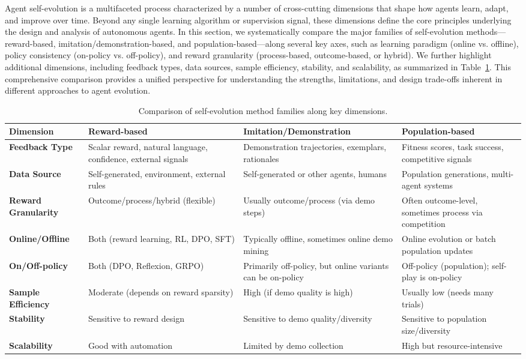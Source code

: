 \documentclass[10pt]{article} %
\begin{document}
Agent self-evolution is a multifaceted process characterized by a number of cross-cutting dimensions that shape how agents learn, adapt, and improve over time. Beyond any single learning algorithm or supervision signal, these dimensions define the core principles underlying the design and analysis of autonomous agents. In this section, we systematically compare the major families of self-evolution methods—reward-based, imitation/demonstration-based, and population-based—along several key axes, such as learning paradigm (online vs. offline), policy consistency (on-policy vs. off-policy), and reward granularity (process-based, outcome-based, or hybrid). We further highlight additional dimensions, including feedback types, data sources, sample efficiency, stability, and scalability, as summarized in Table~\ref{tab:comparison_dimension}. This comprehensive comparison provides a unified perspective for understanding the strengths, limitations, and design trade-offs inherent in different approaches to agent evolution.


\begin{table}[t]
\centering
\caption{Comparison of self-evolution method families along key dimensions.}
\label{tab:comparison_dimension} %
\begin{tabularx}{\textwidth}{l XXX} %
\toprule
\textbf{Dimension} & \textbf{Reward-based} & \textbf{Imitation/Demonstration} & \textbf{Population-based} \\
\midrule
\textbf{Feedback Type} 
  & Scalar reward, natural language, confidence, external signals
  & Demonstration trajectories, exemplars, rationales
  & Fitness scores, task success, competitive signals \\
\textbf{Data Source} 
  & Self-generated, environment, external rules
  & Self-generated or other agents, humans
  & Population generations, multi-agent systems \\
\textbf{Reward Granularity} 
  & Outcome/process/hybrid (flexible)
  & Usually outcome/process (via demo steps)
  & Often outcome-level, sometimes process via competition \\
\textbf{Online/Offline} 
  & Both (reward learning, RL, DPO, SFT)
  & Typically offline, sometimes online demo mining
  & Online evolution or batch population updates \\
\textbf{On/Off-policy} 
  & Both (DPO, Reflexion, GRPO)
  & Primarily off-policy, but online variants can be on-policy
  & Off-policy (population); self-play is on-policy\\
\textbf{Sample Efficiency} 
  & Moderate (depends on reward sparsity)
  & High (if demo quality is high)
  & Usually low (needs many trials) \\
\textbf{Stability} 
  & Sensitive to reward design
  & Sensitive to demo quality/diversity
  & Sensitive to population size/diversity\\
\textbf{Scalability}
  & Good with automation
  & Limited by demo collection
  & High but resource-intensive \\
\bottomrule
\end{tabularx}
\end{table}
\end{document}
